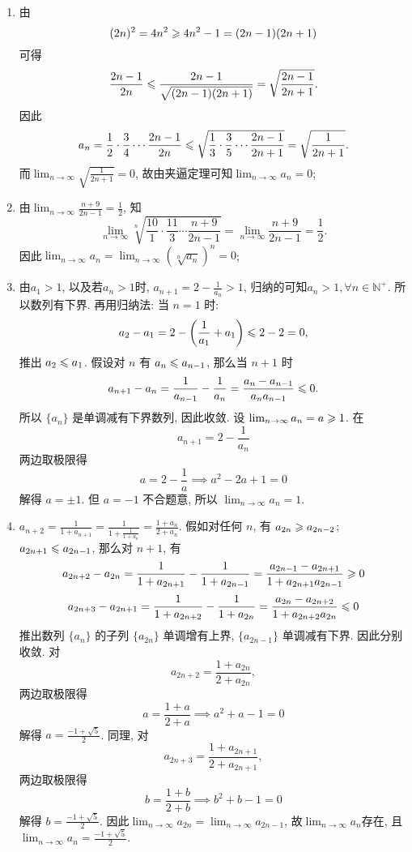\begin{solution}
    \begin{enumerate}[(1)]
        \item 由$$(2n)^2 = 4n^2 \geqslant 4n^2 - 1 = (2n-1)(2n+1)$$可得$$\frac{2n-1}{2n} \leqslant \frac{2n-1}{\sqrt{(2n-1)(2n+1)}} = \sqrt{\frac{2n-1}{2n+1}}.$$因此$$a_n = \frac{1}{2} \cdot \frac{3}{4} \cdots \frac{2n-1}{2n} \leqslant \sqrt{\frac{1}{3} \cdot \frac{3}{5} \cdots \frac{2n-1}{2n+1}} = \sqrt{\frac{1}{2n+1}}.$$
              而$\lim_{n\to\infty} \sqrt{\frac{1}{2n+1}} = 0$,  故由夹逼定理可知$\lim_{n\to\infty} a_n = 0$;
        \item 由$\lim_{n \to \infty} \frac{n+9}{2n-1} = \frac{1}{2}$, 知$$\lim_{n\to\infty} \sqrt[n]{\frac{10}{1} \cdot \frac{11}{3} \cdots \frac{n+9}{2n-1}} = \lim_{n\to\infty} \frac{n+9}{2n-1} = \frac{1}{2}.$$
              因此$\lim_{n\to\infty} a_n = \lim_{n\to\infty} \left(\sqrt[n]{a_n}\right)^n = 0$;
        \item 由$a_1 > 1$, 以及若$a_n > 1$时,  $a_{n+1} = 2 - \frac{1}{a_n} > 1$, 归纳的可知$a_n > 1,  \forall n \in \mathbb{N}^+$. 所以数列有下界. 再用归纳法: 当 $n=1$ 时:
              $$ a_2 - a_1 = 2 - \left(\frac{1}{a_1} + a_1\right) \leqslant 2-2=0,  $$
              推出 $a_2 \leqslant a_1$. 假设对 $n$ 有 $a_n \leqslant a_{n-1}$,  那么当 $n+1$ 时
              $$ a_{n+1} - a_n = \frac{1}{a_{n-1}} - \frac{1}{a_n} = \frac{a_n - a_{n-1}}{a_n a_{n-1}} \leqslant 0. $$
              所以 $\{a_n\}$ 是单调减有下界数列,  因此收敛. 设 $\lim_{n \to \infty} a_n = a \geqslant 1$. 在
              $$ a_{n+1} = 2 - \frac{1}{a_n} $$
              两边取极限得
              $$ a = 2 - \frac{1}{a} \implies a^2 - 2a + 1 = 0 $$
              解得 $a=\pm 1$. 但 $a=-1$ 不合题意,  所以 $\lim_{n \to \infty} a_n = 1$.
        \item $a_{n+2} = \frac{1}{1+a_{n+1}} = \frac{1}{1+\frac{1}{1+a_n}} = \frac{1+a_n}{2+a_n}$.
              假如对任何 $n$,  有 $a_{2n} \geqslant a_{2n-2}$; $a_{2n+1} \leqslant a_{2n-1}$,  那么对 $n+1$,  有
              $$ a_{2n+2} - a_{2n} = \frac{1}{1+a_{2n+1}} - \frac{1}{1+a_{2n-1}} = \frac{a_{2n-1}-a_{2n+1}}{1+a_{2n+1}a_{2n-1}} \geqslant 0 $$
              $$ a_{2n+3} - a_{2n+1} = \frac{1}{1+a_{2n+2}} - \frac{1}{1+a_{2n}} = \frac{a_{2n}-a_{2n+2}}{1+a_{2n+2}a_{2n}} \leqslant 0 $$
              推出数列 $\{a_n\}$ 的子列 $\{a_{2n}\}$ 单调增有上界,  $\{a_{2n-1}\}$ 单调减有下界. 因此分别收敛. 对$$a_{2n+2} = \frac{1+a_{2n}}{2+a_{2n}}, $$两边取极限得
              $$ a = \frac{1+a}{2+a} \implies a^2 + a - 1 = 0 $$
              解得 $a = \frac{-1+\sqrt{5}}{2}$. 同理,  对$$a_{2n+3} = \frac{1+a_{2n+1}}{2+a_{2n+1}}, $$两边取极限得
              $$ b = \frac{1+b}{2+b} \implies b^2 + b - 1 = 0 $$
              解得 $b = \frac{-1+\sqrt{5}}{2}$.
              因此$\lim_{n \to \infty} a_{2n} = \lim_{n \to \infty} a_{2n-1}$,  故$\lim_{n \to \infty} a_n$存在,  且$\lim_{n \to \infty} a_n = \frac{-1+\sqrt{5}}{2}$.
    \end{enumerate}
\end{solution}

